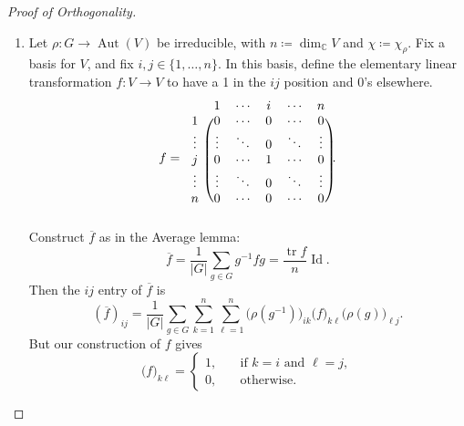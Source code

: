 \documentclass[12pt]{article}
\newcommand{\cx}{\mathbb{C}}
\newcommand{\oneton}[1]{\{1,\dotsc,#1\}}
\newcommand\inv[1]{#1^{-1}}
\theoremstyle{definition}
\DeclareMathOperator\Aut{Aut}
\DeclareMathOperator\Id{Id}
\DeclareMathOperator\tr{tr}
\begin{document}
\begin{proof}[Proof of Orthogonality]
    \noindent
    \begin{enumerate}
        \item Let $\rho : G \to \Aut(V)$ be irreducible, with $n \coloneqq  \dim_{\cx} V$ and $\chi \coloneqq  \chi_{\rho}$. Fix a basis for $V$, and fix $i , j \in \oneton{n}$. In this basis, define the elementary linear transformation $f : V \to V$ to have a 1 in the $ij$ position and 0's elsewhere.
        \begin{equation}
            f = 
            \begin{blockarray}{cccccc}
                  & 1 & \cdots & i & \cdots & n \\
                \begin{block}{c(ccccc)}
                1 & 0 & \cdots & 0 & \cdots & 0 \\
                \vdots & \vdots & \ddots & 0 & \ddots & \vdots \\
                j & 0 & \cdots & 1 & \cdots & 0 \\
                \vdots & \vdots & \ddots & 0 & \ddots & \vdots \\
                n & 0 & \cdots & 0 & \cdots & 0 \\
                \end{block}
            \end{blockarray}.
        \end{equation}
        Construct $\overline{f}$ as in the Average lemma: 
        \begin{equation}
            \overline{f} = \frac{1}{|G|} \sum\limits_{g \in G} \inv{g} f g = \frac{\tr f}{n} \Id.
        \end{equation}
        Then the $ij$ entry of $\overline{f}$ is 
        \begin{equation}
            \left( \overline{f} \right)_{ij} = \frac{1}{|G|} \sum\limits_{g \in G} \sum\limits_{k = 1}^n \sum\limits_{\ell = 1}^n \big( \rho \left( \inv{g} \right) \big)_{i k} \big( f \big)_{k \ell} \big( \rho(g) \big)_{\ell j}.
        \end{equation}
        But our construction of $f$ gives 
        \begin{equation}
            \big( f \big)_{k \ell} = 
            \begin{cases}
                1 , & \quad \text{if $k = i$ and $\ell = j$}, \\
                0 , & \quad \text{otherwise}.
            \end{cases}

\end{equation}
\end{enumerate}
\end{proof}
\end{document}
